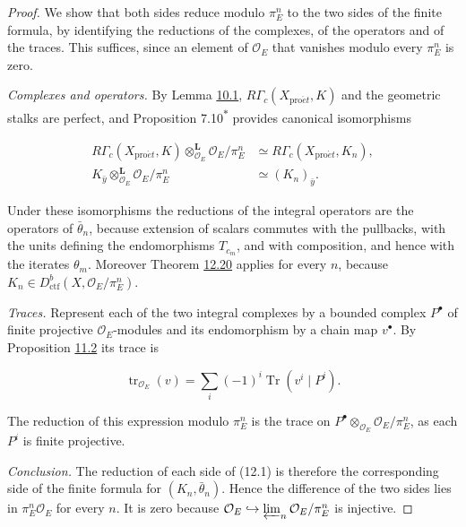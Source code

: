 \documentclass[11pt]{article}
\newcommand{\bpout}[1]{#1\textsuperscript{\hyperlink{bp-outside}{\ensuremath{\ast}}}}
\begin{document}
\begin{proof}[{Proof}]\label{bp292}%
We show that both sides reduce modulo \(\pi_E^n\) to the two sides of the finite formula, by identifying the reductions of the complexes, of the operators and of the traces. This suffices, since an element of \(\mathcal O_E\) that vanishes modulo every \(\pi_E^n\) is zero.

\emph{Complexes and operators.} By Lemma \hyperref[bp105]{10.1}, \(R\Gamma_c(X_{\mathrm{pro}\acute{e}t},K)\) and the geometric stalks are perfect, and Proposition \bpout{7.10} provides canonical isomorphisms

\[
\begin{aligned}
R\Gamma_c(X_{\mathrm{pro}\acute{e}t},K)\otimes^{\mathbf L}_{\mathcal O_E}\mathcal O_E/\pi_E^n
&\simeq R\Gamma_c(X_{\mathrm{pro}\acute{e}t},K_n),\\
K_{\bar y}\otimes^{\mathbf L}_{\mathcal O_E}\mathcal O_E/\pi_E^n&\simeq(K_n)_{\bar y}.
\end{aligned}
\]

Under these isomorphisms the reductions of the integral operators are the operators of \(\bar\theta_n\), because extension of scalars commutes with the pullbacks, with the units defining the endomorphisms \(T_{c_m}\), and with composition, and hence with the iterates \(\theta_m\). Moreover Theorem \hyperref[bp287]{12.20} applies for every \(n\), because \(K_n\in D^b_{\mathrm{ctf}}(X,\mathcal O_E/\pi_E^n)\).

\emph{Traces.} Represent each of the two integral complexes by a bounded complex \(P^\bullet\) of finite projective \(\mathcal O_E\)-modules and its endomorphism by a chain map \(v^\bullet\). By Proposition \hyperref[bp176]{11.2} its trace is

\[
\operatorname{tr}_{\mathcal O_E}(v)
=\sum_i(-1)^i\operatorname{Tr}(v^i\mid P^i).
\]

The reduction of this expression modulo \(\pi_E^n\) is the trace on \(P^\bullet\otimes_{\mathcal O_E}\mathcal O_E/\pi_E^n\), as each \(P^i\) is finite projective.

\emph{Conclusion.} The reduction of each side of (12.1) is therefore the corresponding side of the finite formula for \((K_n,\bar\theta_n)\). Hence the difference of the two sides lies in \(\pi_E^n\mathcal O_E\) for every \(n\). It is zero because \(\mathcal O_E\hookrightarrow\varprojlim_n\mathcal O_E/\pi_E^n\) is injective.
\end{proof}
\end{document}
